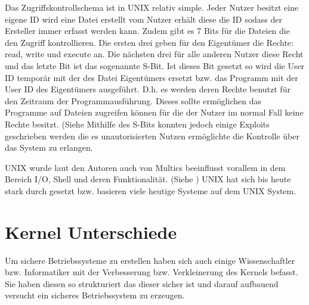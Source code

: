 \documentclass[9pt,technote]{IEEEtran}
\begin{document}
    Das Zugriffskontrollschema ist in UNIX relativ simple. Jeder Nutzer besitzt eine eigene ID wird eine Datei erstellt vom Nutzer erh\"alt diese die ID sodass der Ersteller immer
    erfasst werden kann. Zudem gibt es 7 Bits f\"ur die Dateien die den Zugriff kontrollieren. Die ersten drei geben f\"ur den Eigent\"umer die Rechte: read, write und execute an.
    Die n\"achsten drei f\"ur alle anderen Nutzer diese Recht und das letzte Bit ist das sogenannte S-Bit. Ist dieses Bit gesetzt so wird die User ID tempor\"ar
    mit der des Datei Eigent\"umers ersetzt bzw. das Programm mit der User ID des Eigent\"umers ausgef\"uhrt.
    D.h. es werden deren Rechte benutzt f\"ur den Zeitraum der Programmausf\"uhrung. Dieses sollte erm\"oglichen das Programme
    auf Dateien zugreifen k\"onnen f\"ur die der Nutzer im normal Fall keine Rechte besitzt. (Siehe \cite[S. 367]{inproc:unix}    
    Mithilfe des S-Bits konnten jedoch einige Exploits geschrieben werden die es unautorisierten Nutzen erm\"oglichte
    die Kontrolle \"uber das System zu erlangen. 
    
    UNIX wurde laut den Autoren auch von Multics beeinflusst vorallem in dem Bereich I/O, Shell und deren Funktionalit\"at. (Siehe \cite[S. 374]{inproc:unix})
    UNIX hat sich bis heute stark durch gesetzt bzw. basieren viele heutige Systeme auf dem UNIX System.
    
    
    
    
  
   
  \section{Kernel Unterschiede} \label{sec:kernel}
    Um sichere Betriebssysteme zu erstellen haben sich auch einige Wissenschaftler bzw. Informatiker mit der Verbesserung bzw. Verkleinerung
    des Kernels befasst. Sie haben diesen so strukturiert das dieser sicher ist und darauf aufbauend versucht ein sicheres Betriebssystem zu erzeugen.
  


\end{document}
